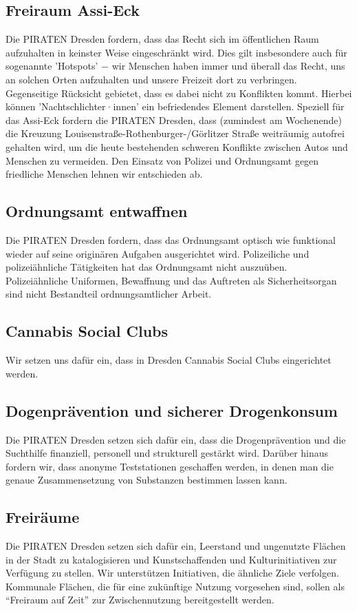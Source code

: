 \documentclass[a4paper, 11pt]{article}
\begin{document}
\subsection{Freiraum Assi-Eck}
Die PIRATEN Dresden fordern, dass das Recht sich im öffentlichen Raum aufzuhalten in keinster Weise eingeschränkt wird. Dies gilt insbesondere auch für sogenannte 'Hotspots' $-$ wir Menschen haben immer und überall das Recht, uns an solchen Orten aufzuhalten und unsere Freizeit dort zu verbringen. Gegenseitige Rücksicht gebietet, dass es dabei nicht zu Konflikten kommt. Hierbei können 'Nachtschlichter·innen' ein befriedendes Element darstellen. Speziell für das Assi-Eck fordern die PIRATEN Dresden, dass (zumindest am Wochenende) die Kreuzung Louisenstraße-Rothenburger-/Görlitzer Straße weiträumig autofrei gehalten wird, um die heute bestehenden schweren Konflikte zwischen Autos und Menschen zu vermeiden. Den Einsatz von Polizei und Ordnungsamt gegen friedliche Menschen lehnen wir entschieden ab.


\subsection{Ordnungsamt entwaffnen}
Die PIRATEN Dresden fordern, dass das Ordnungsamt optisch wie funktional wieder auf seine originären Aufgaben ausgerichtet wird. Polizeiliche und polizeiähnliche Tätigkeiten hat das Ordnungsamt nicht auszuüben. Polizeiähnliche Uniformen, Bewaffnung und das Auftreten als Sicherheitsorgan sind nicht Bestandteil ordnungsamtlicher Arbeit.


\subsection{Cannabis Social Clubs}
Wir setzen uns dafür ein, dass in Dresden Cannabis Social Clubs eingerichtet werden.


\subsection{Dogenprävention und sicherer Drogenkonsum}
Die PIRATEN Dresden setzen sich dafür ein, dass die Drogenprävention und die Suchthilfe finanziell, personell und strukturell gestärkt wird. Darüber hinaus fordern wir, dass anonyme Teststationen geschaffen werden, in denen man die genaue Zusammensetzung von Substanzen bestimmen lassen kann.


\subsection{Freiräume}
Die PIRATEN Dresden setzen sich dafür ein, Leerstand und ungenutzte Flächen in der Stadt zu katalogisieren und Kunstschaffenden und Kulturinitiativen zur Verfügung zu stellen. Wir unterstützen Initiativen, die ähnliche Ziele verfolgen. Kommunale Flächen, die für eine zukünftige Nutzung vorgesehen sind, sollen als ``Freiraum auf Zeit'' zur Zwischennutzung bereitgestellt werden.
\end{document}
